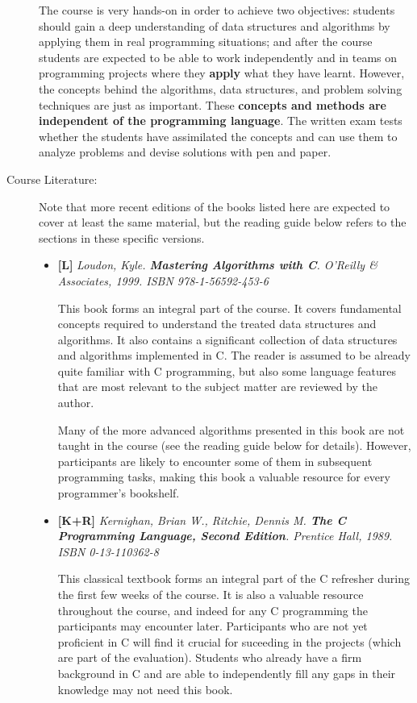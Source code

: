 \documentclass[a4paper]{article}
\newcommand{\refl}{\textbf{[L]}\xspace}
\newcommand{\refkr}{\textbf{[K+R]}\xspace}
\begin{document}
\begin{description}
  The course is very hands-on in order to achieve two objectives:
  students should gain a deep understanding of data structures and algorithms by applying them in real programming situations;
  and after the course students are expected to be able to work independently and in teams on programming projects where they \textbf{apply} what they have learnt.
  However, the concepts behind the algorithms, data structures, and problem solving techniques are just as important.
  These \textbf{concepts and methods are independent of the programming language}.
  The written exam tests whether the students have assimilated the concepts and can use them to analyze problems and devise solutions with pen and paper.
  
\item[Course Literature:]
  Note that more recent editions of the books listed here are expected to cover at least the same material, but the reading guide below refers to the sections in these specific versions.
  
  \begin{itemize}
    
  \item \refl
    \emph{
      Loudon, Kyle.
      \textbf{Mastering Algorithms with C}.
      O'Reilly \& Associates, 1999.
      ISBN 978-1-56592-453-6
    }
    
  This book forms an integral part of the course.
  It covers fundamental concepts required to understand the treated data structures and algorithms.
  It also contains a significant collection of data structures and algorithms implemented in C.
  The reader is assumed to be already quite familiar with C programming, but also some language features that are most relevant to the subject matter are reviewed by the author.
  
  Many of the more advanced algorithms presented in this book are not taught in the course (see the reading guide below for details).
  However, participants are likely to encounter some of them in subsequent programming tasks, making this book a valuable resource for every programmer's bookshelf.
  
  \item \refkr
    \emph{
      Kernighan, Brian W., Ritchie, Dennis M.
      \textbf{The C Programming Language, \emph{Second Edition}}.
      Prentice Hall, 1989.
      ISBN 0-13-110362-8
    }
    
    This classical textbook forms an integral part of the C refresher during the first few weeks of the course.
    It is also a valuable resource throughout the course, and indeed for any C programming the participants may encounter later.
    Participants who are not yet proficient in C will find it crucial for suceeding in the projects (which are part of the evaluation).
    Students who already have a firm background in C and are able to independently fill any gaps in their knowledge may not need this book.
    

\end{itemize}
\end{description}
\end{document}
